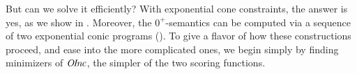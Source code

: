 \documentclass{article}
\newcommand\obslimit{observational facet} %
\begin{document}
But can we solve it efficiently?
% 
With exponential cone constraints,
the answer is yes, as we show in .
Moreover,
the $0^+$\!-semantics
can be computed via a sequence of two exponential conic programs ().
To give a flavor of how these constructions proceed, and ease into
the more complicated ones, we begin simply by finding minimizers of $\mathit{O\mskip-2.5muI\mskip-3.5mun\mskip-1.7muc}$, the simpler of the two scoring functions.
\end{document}
